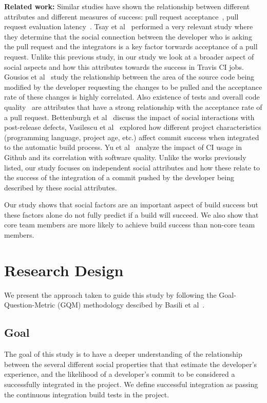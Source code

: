 \documentclass[10pt, conference]{IEEEtran}
\begin{document}
\textbf{Related work:}
Similar studies have shown the relationship between different attributes and 
different measures of success: pull request acceptance~\cite{gousios14, 
gousios15,tsay14icse,tsay14fse}, pull request evaluation latency~\cite{Yu15}.
Tsay et al~\cite{tsay14icse} performed a very relevant study where they 
determine that the social connection between the developer who is asking the 
pull request and the integrators is a key factor torwards acceptance of a pull 
request. Unlike this previous study, in our study we look at a broader aspect of 
social aspects and how this attributes towards the success in Travis CI jobs. 
Gousios et al~\cite{gousios14} study the relationship between the area of the 
source code being modified by the developer requesting the changes to be pulled 
and the acceptance rate of these changes is highly correlated. Also existence of 
tests and overall code quality~\cite{gousios15} are attributes that have a 
strong relationship with the acceptance rate of a pull request. Bettenburgh et 
al~\cite{bettenburgh10} discuss the impact of social interactions with 
post-release defects, Vasilescu et al~\cite{vasilescu14} explored how different 
project characteristics (programming language, project age, etc.) affect commit 
success when integrated to the automatic build process. Yu et al~\cite{yu16} 
analyze the impact of CI usage in Github and its correlation with software 
quality. Unlike the works previously listed, our study focuses on independent social 
attributes and how these relate to the success of the integration of a commit 
pushed by the developer being described by these social attributes.

Our study shows that social factors are an important aspect of build success but
these factors alone do not fully predict if a build will succeed.  We also show
that core team members are more likely to achieve build success than non-core
team members.

\section{Research Design}
We present the approach taken to guide this study by
following the Goal-Question-Metric (GQM) methodology descibed by Basili et 
al~\cite{Basili84}.

\subsection{Goal}
The goal of this study is to have a deeper understanding of the relationship 
between the several different social properties that that estimate the
developer's experience, and the likelihood of a developer's commit
to be considered a successfully integrated in the project. We define successful
integration as passing the continuous integration build tests in the project.
\end{document}
